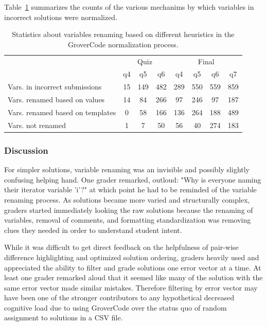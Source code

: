 Table~\ref{table:renametype} summarizes the counts of the various mechanims by which variables in incorrect solutions were normalized.

\begin{table}
\centering
\begin{tabular}{|l|c|c|c|c|c|c|c|}
\hline
& \multicolumn{3}{c|}{Quiz} & \multicolumn{4}{c|}{Final} \\
\cline{2-8}
& q4 & q5 & q6 & q4 & q5 & q6 & q7 \\
\hline
Vars. in incorrect submissions & 15 & 149 & 482 & 289 & 550 & 559 & 859 \\
\hline
Vars. renamed based on values & 14 & 84 & 266 & 97 & 246 & 97 & 187 \\
\hline
Vars. renamed based on templates & 0 & 58 & 166 & 136 & 264 & 188 & 489 \\
\hline
Vars. not renamed & 1 & 7 & 50 & 56 & 40 & 274 & 183 \\
\hline
\end{tabular}
\caption{Statistics about variables renaming based on different heuristics in the GroverCode normalization process.}
\label{table:renametype}
\end{table}
 
\subsubsection{Discussion}
For simpler solutions, variable renaming was an invisible and possibly slightly confusing helping hand. One grader remarked, outloud: "Why is everyone naming their iterator variable 'i'?" at which point he had to be reminded of the variable renaming process. As solutions became more varied and structurally complex, graders started immediately looking the raw solutions because the renaming of variables, removal of comments, and formatting standardization was removing clues they needed in order to understand student intent.

While it was difficult to get direct feedback on the helpfulness of pair-wise difference highlighting and optimized solution ordering, graders heavily used and appreciated the ability to filter and grade solutions one error vector at a time. At least one grader remarked aloud that it seemed like many of the solution with the same error vector made similar mistakes. Therefore filtering by error vector may have been one of the stronger contributors to any hypothetical decreased cognitive load due to using GroverCode over the status quo of random assignment to solutions in a CSV file.

